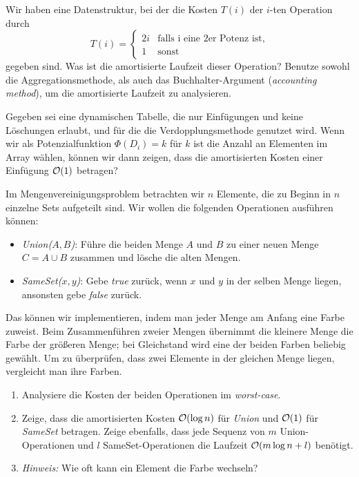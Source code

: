 \documentclass{uebung_cs}
\begin{document}
\begin{aufgabe}
	Wir haben eine Datenstruktur, bei der die Kosten $T(i)$ der $i$-ten Operation durch 
	$$T(i) = \begin{cases} 2i & \text{falls i eine 2er Potenz ist}, \\ 1 & \text{sonst} \end{cases}$$ 
	gegeben sind.
	Was ist die amortisierte Laufzeit dieser Operation? Benutze sowohl die Aggregationsmethode, als auch das Buchhalter-Argument (\textit{accounting method}), um die amortisierte Laufzeit zu analysieren.
\end{aufgabe}    

\begin{aufgabe}
	Gegeben sei eine dynamischen Tabelle, die nur Einfügungen und keine Löschungen erlaubt, und für die die Verdopplungsmethode genutzet wird. Wenn wir als Potenzialfunktion $\Phi(D_i) = k$ für $k$ ist die Anzahl an Elementen im Array wählen, können wir dann zeigen, dass die amortisierten Kosten einer Einfügung $\mathcal{O}(1)$ betragen?
\end{aufgabe}

\begin{aufgabe}[Mengenvereinigung]
	Im Mengenvereinigungsproblem betrachten wir $n$ Elemente, die zu Beginn in $n$ einzelne Sets aufgeteilt sind. Wir wollen die folgenden Operationen ausführen können:
	\begin{itemize}
		\item \emph{Union($A,B$)}: Führe die beiden Menge $A$ und $B$ zu einer neuen Menge $C = A \cup B$ zusammen und lösche die alten Mengen.
		\item \emph{SameSet($x,y$)}: Gebe \textit{true} zurück, wenn $x$ und $y$ in der selben Menge liegen, ansonsten gebe \textit{false} zurück.
	\end{itemize}
	Das können wir implementieren, indem man jeder Menge am Anfang eine Farbe zuweist. Beim Zusammenführen zweier Mengen übernimmt die kleinere Menge die Farbe der größeren Menge; bei Gleichstand wird eine der beiden Farben beliebig gewählt. Um zu überprüfen, dass zwei Elemente in der gleichen Menge liegen, vergleicht man ihre Farben.
	\begin{enumerate}
		\item Analysiere die Kosten der beiden Operationen im \textit{worst-case}.
		\item Zeige, dass die amortisierten Kosten $\mathcal{O}(\log n)$ für \emph{Union} und $\mathcal{O}(1)$ für \emph{SameSet} betragen. Zeige ebenfalls, dass jede Sequenz von $m$ Union-Operationen und $l$ SameSet-Operationen die Laufzeit $\mathcal{O}(m \log n + l)$ benötigt.
		\item[] \textit{Hinweis:} Wie oft kann ein Element die Farbe wechseln?
	\end{enumerate}
\end{aufgabe}
\end{document}
